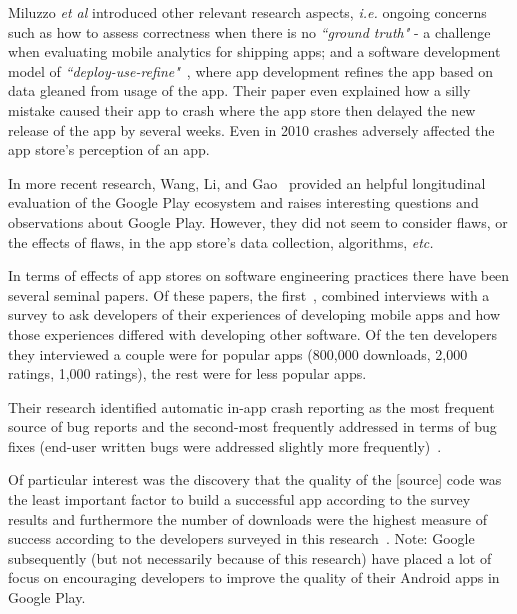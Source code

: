 Miluzzo \emph{et al} introduced other relevant research aspects, \emph{i.e.}  ongoing concerns such as how to assess correctness when there is no \emph{``ground truth"} - a challenge when evaluating mobile analytics for shipping apps; and a software development model of \emph{``deploy-use-refine"}~, where app development refines the app based on data gleaned from usage of the app. Their paper even explained how a silly mistake caused their app to crash where the app store then delayed the new release of the app by several weeks. Even in 2010 crashes adversely affected the app store's perception of an app. %


In more recent research, Wang, Li, and Gao~ provided an helpful longitudinal evaluation of the Google Play ecosystem and raises interesting questions and observations about Google Play. However, they did not seem to consider flaws, or the effects of flaws, in the app store's data collection, algorithms,\emph{ etc.}

In terms of effects of app stores on software engineering practices there have been several seminal papers. %
%
Of these papers, the first~, combined interviews with a survey to ask developers of their experiences of developing mobile apps and how those experiences differed with developing other software.
%
Of the ten developers they interviewed a couple were for popular apps (800,000 downloads, 2,000 ratings, 1,000 ratings), the rest were for less popular apps. %

Their research identified automatic in-app crash reporting as the most frequent source of bug reports and the second-most frequently addressed in terms of bug fixes (end-user written bugs were addressed slightly more frequently)~. 

Of particular interest was the discovery that the quality of the [source] code was the least important factor to build a successful app according to the survey results and furthermore the number of downloads were the highest measure of success according to the developers surveyed in this research~. Note: Google subsequently (but not necessarily because of this research) have placed a lot of focus on encouraging developers to improve the quality of their Android apps in Google Play. 

